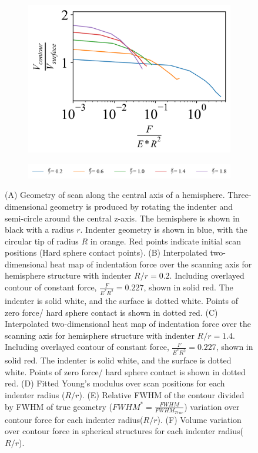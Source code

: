 \begin{figure}[ht]
\begin{subfigure}[t]{0.325\textwidth}
        \includegraphics[width=1\linewidth]{Figures/Hemisphere-Volume.png}
    \end{subfigure}

     \hfill
     
    \begin{subfigure}[t]{1\textwidth}
        \includegraphics[width=1\linewidth]{Figures/Hemisphere-Legend.png}
    \end{subfigure}
    
    \caption{\label{fig: Hemisphere Compression Plot}(A) Geometry of scan along the central axis of a hemisphere. Three-dimensional geometry is produced by rotating the indenter and semi-circle around the central z-axis. The hemisphere is shown in black with a radius $r$. Indenter geometry is shown in blue, with the circular tip of radius $R$ in orange. Red points indicate initial scan positions (Hard sphere contact points). (B) Interpolated two-dimensional heat map of indentation force over the scanning axis for hemisphere structure with indenter $R/r=0.2$. Including overlayed contour of constant force, $\frac{F}{E^*R^2} = 0.227 $, shown in solid red. The indenter is solid white, and the surface is dotted white. Points of zero force/ hard sphere contact is shown in dotted red. (C) Interpolated two-dimensional heat map of indentation force over the scanning axis for hemisphere structure with indenter $R/r=1.4$. Including overlayed contour of constant force, $\frac{F}{E^*R^2} = 0.227 $, shown in solid red. The indenter is solid white, and the surface is dotted white. Points of zero force/ hard sphere contact is shown in dotted red. (D) Fitted Young's modulus over scan positions for each indenter radius ($R/r$). (E) Relative FWHM of the contour divided by FWHM of true geometry ($FWHM^*=\frac{FWHM}{FWHM_{True}}$) variation over contour force for each indenter radius($R/r$). (F)  Volume variation over contour force in spherical structures for each indenter radius($R/r$).}
    
\end{figure}

